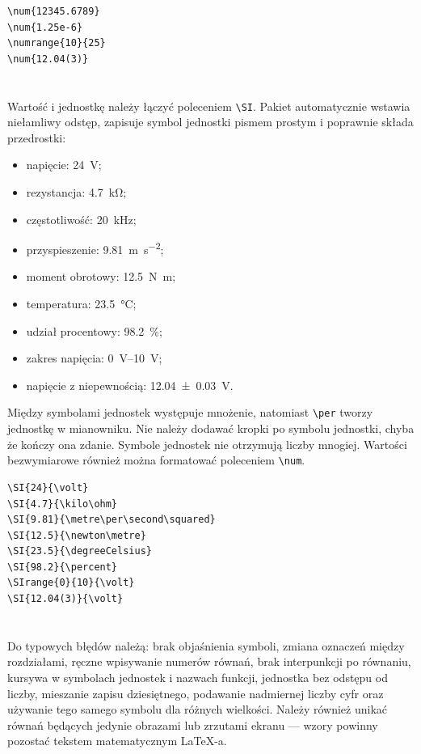 \begin{lstlisting}[style=thesis,caption={Formatowanie liczb za pomocą siunitx},label={lst:liczby-siunitx}]
\num{12345.6789}
\num{1.25e-6}
\numrange{10}{25}
\num{12.04(3)}
\end{lstlisting}

\section{}

Wartość i jednostkę należy łączyć poleceniem \verb|\SI|. Pakiet automatycznie wstawia
niełamliwy odstęp, zapisuje symbol jednostki pismem prostym i poprawnie składa przedrostki:
\begin{itemize}
  \item napięcie: \SI{24}{\volt};
  \item rezystancja: \SI{4.7}{\kilo\ohm};
  \item częstotliwość: \SI{20}{\kilo\hertz};
  \item przyspieszenie: \SI{9.81}{\metre\per\second\squared};
  \item moment obrotowy: \SI{12.5}{\newton\metre};
  \item temperatura: \SI{23.5}{\degreeCelsius};
  \item udział procentowy: \SI{98.2}{\percent};
  \item zakres napięcia: \SIrange{0}{10}{\volt};
  \item napięcie z niepewnością: \SI{12.04(3)}{\volt}.
\end{itemize}

Między symbolami jednostek występuje mnożenie, natomiast \verb|\per| tworzy jednostkę
w mianowniku. Nie należy dodawać kropki po symbolu jednostki, chyba że kończy ona zdanie.
Symbole jednostek nie otrzymują liczby mnogiej. Wartości bezwymiarowe również można
formatować poleceniem \verb|\num|.

\begin{lstlisting}[style=thesis,caption={Przykłady zapisu jednostek SI},label={lst:jednostki-si}]
\SI{24}{\volt}
\SI{4.7}{\kilo\ohm}
\SI{9.81}{\metre\per\second\squared}
\SI{12.5}{\newton\metre}
\SI{23.5}{\degreeCelsius}
\SI{98.2}{\percent}
\SIrange{0}{10}{\volt}
\SI{12.04(3)}{\volt}
\end{lstlisting}

\section{}

Do typowych błędów należą: brak objaśnienia symboli, zmiana oznaczeń między rozdziałami,
ręczne wpisywanie numerów równań, brak interpunkcji po równaniu, kursywa w symbolach
jednostek i nazwach funkcji, jednostka bez odstępu od liczby, mieszanie zapisu
dziesiętnego, podawanie nadmiernej liczby cyfr oraz używanie tego samego symbolu dla
różnych wielkości. Należy również unikać równań będących jedynie obrazami lub zrzutami
ekranu --- wzory powinny pozostać tekstem matematycznym LaTeX-a.
